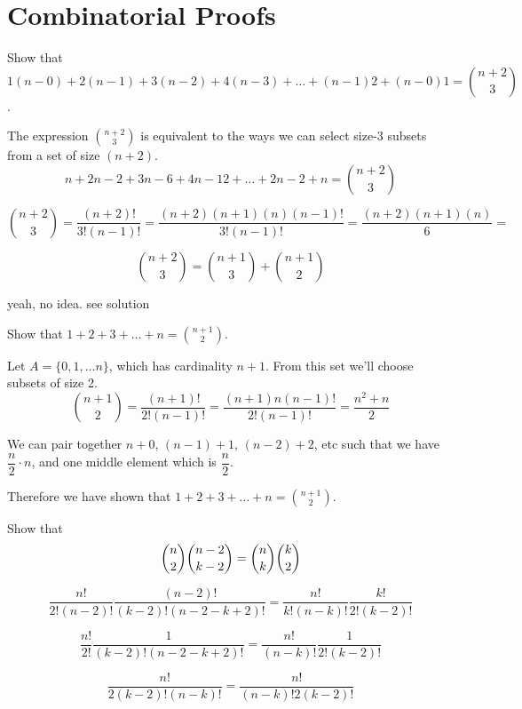 \documentclass[openany, 12pt]{book}
\begin{document}
\section{Combinatorial Proofs}
\begin{exercise}{}{}
	Show that
	$$1(n-0)+2(n-1)+3(n-2)+4(n-3)+\dots+(n-1)2+(n-0)1 = \binom{n+2}{3}$$ .
	\begin{alist}
		\item The expression $\binom{n+2}{3}$ is equivalent to the ways we can select
		size-3 subsets from a set of size $(n+2)$.
		$$
			n+2n-2+3n-6+4n-12+\dots+2n-2+n = \binom{n+2}{3}
		$$

		$$
			\binom{n+2}{3}=
			\dfrac{(n+2)!}{3!(n-1)!}=
			\dfrac{(n+2)(n+1)(n)(n-1)!}{3!(n-1)!}=
			\dfrac{(n+2)(n+1)(n)}{6}=
		$$

		$$
			\binom{n+2}{3} = \binom{n+1}{3} + \binom{n+1}{2}
		$$
	\end{alist}
	yeah, no idea. see solution
\end{exercise}

\begin{exercise}{}{}
	Show that $1 + 2 + 3 + \dots + n = \binom{n+1}{2}$.
	\begin{alist}
		\item Let $A=\{0, 1, ... n\}$, which has cardinality $n+1$.  From this set we'll
		choose subsets of size 2.
		$$
			\binom{n+1}{2} =
			\dfrac{(n+1)!}{2!(n-1)!} =
			\dfrac{(n+1)n(n-1)!}{2!(n-1)!} =
			\dfrac{n^2+n}{2}
		$$
		\item We can pair together $n+0$, $(n-1) + 1$, $(n-2) + 2$, etc such that we
		have $\dfrac{n}{2}\cdot n$, and one middle element which is $\dfrac{n}{2}$.
		\item Therefore we have shown that $1 + 2 + 3 + \dots + n = \binom{n+1}{2}$.
	\end{alist}
\end{exercise}

\begin{exercise}{}{}
	Show that
	$$ \dbinom{n}{2} \dbinom{n-2}{k-2}= \dbinom{n}{k} \dbinom{k}{2} $$
	\begin{alist}
		\item
		$$ \dfrac{n!}{2!(n-2)!} \dfrac{(n-2)!}{(k-2)!(n-2-k+2)!}=
			\dfrac{n!}{k!(n-k)!} \dfrac{k!}{2!(k-2)!} $$
		\item
		$$ \dfrac{n!}{2!} \dfrac{1}{(k-2)!(n-2-k+2)!}= \dfrac{n!}{(n-k)!} \dfrac{1}{2!(k-2)!} $$
		\item
		$$ \dfrac{n!}{2(k-2)!(n-k)!}= \dfrac{n!}{(n-k)!2(k-2)!} $$
	\end{alist}
\end{exercise}
\end{document}
